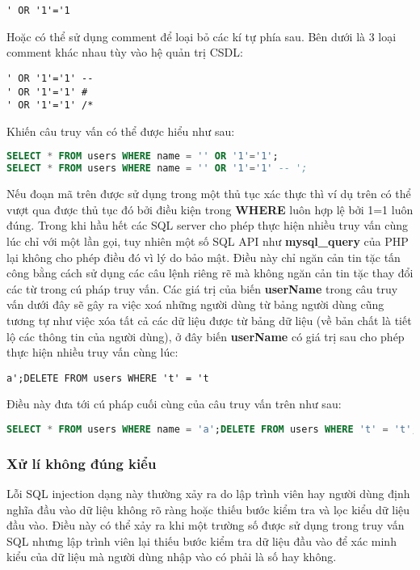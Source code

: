 \documentclass[../main-report.tex]{subfiles}
\begin{document}
\begin{lstlisting}
' OR '1'='1
\end{lstlisting}

Hoặc có thể sử dụng comment để loại bỏ các kí tự phía sau. Bên dưới là 3 loại comment khác nhau tùy vào hệ quản trị CSDL:

\begin{lstlisting}
' OR '1'='1' --
' OR '1'='1' #
' OR '1'='1' /*
\end{lstlisting}

Khiến câu truy vấn có thể được hiểu như sau:

\begin{lstlisting}[language=SQL]
SELECT * FROM users WHERE name = '' OR '1'='1';
SELECT * FROM users WHERE name = '' OR '1'='1' -- ';
\end{lstlisting}

Nếu đoạn mã trên được sử dụng trong một thủ tục xác thực thì ví dụ trên có thể vượt qua được thủ tục đó bởi điều kiện trong \textbf{WHERE} luôn hợp lệ bởi 1=1 luôn đúng. Trong khi hầu hết các SQL server cho phép thực hiện nhiều truy vấn cùng lúc chỉ với một lần gọi, tuy nhiên một số SQL API như \textbf{mysql\_query} của PHP lại không cho phép điều đó vì lý do bảo mật. Điều này chỉ ngăn cản tin tặc tấn công bằng cách sử dụng các câu lệnh riêng rẽ mà không ngăn cản tin tặc thay đổi các từ trong cú pháp truy vấn. Các giá trị của biến \textbf{userName} trong câu truy vấn dưới đây sẽ gây ra việc xoá những người dùng từ bảng người dùng cũng tương tự như việc xóa tất cả các dữ liệu được từ bảng dữ liệu (về bản chất là tiết lộ các thông tin của người dùng), ở đây biến \textbf{userName} có giá trị sau cho phép thực hiện nhiều truy vấn cùng lúc:

\begin{lstlisting}
a';DELETE FROM users WHERE 't' = 't
\end{lstlisting}


Điều này đưa tới cú pháp cuối cùng của câu truy vấn trên như sau:

\begin{lstlisting}[language=SQL]
SELECT * FROM users WHERE name = 'a';DELETE FROM users WHERE 't' = 't';
\end{lstlisting}

\subsubsection*{Xử lí không đúng kiểu}
Lỗi SQL injection dạng này thường xảy ra do lập trình viên hay người dùng định nghĩa đầu vào dữ liệu không rõ ràng hoặc thiếu bước kiểm tra và lọc kiểu dữ liệu đầu vào. Điều này có thể xảy ra khi một trường số được sử dụng trong truy vấn SQL nhưng lập trình viên lại thiếu bước kiểm tra dữ liệu đầu vào để xác minh kiểu của dữ liệu mà người dùng nhập vào có phải là số hay không.
\end{document}
